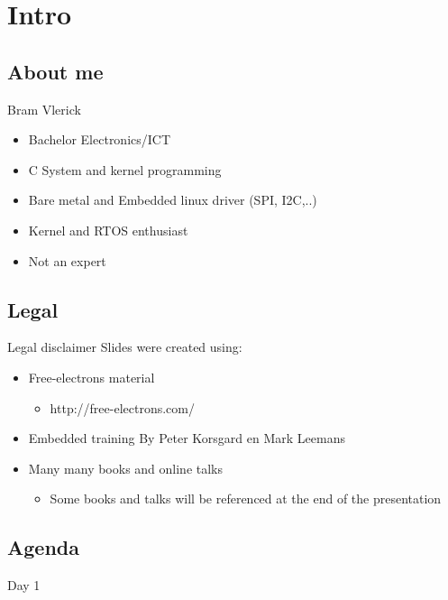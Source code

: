 \section{Intro}
\subsection{About me}
\begin{frame}{Bram Vlerick}
\begin{itemize}
\item Bachelor Electronics/ICT
\item C System and kernel programming
\item Bare metal and Embedded linux driver (SPI, I2C,..)
\item Kernel and RTOS enthusiast
\item Not an expert
\end{itemize}
\end{frame}

\subsection{Legal}
\begin{frame}{Legal disclaimer}
Slides were created using:
\begin{itemize}
\item Free-electrons material
\begin{itemize}
\item http://free-electrons.com/
\end{itemize}
\item Embedded training By Peter Korsgard en Mark Leemans
\item Many many books and online talks
\begin{itemize}
\item Some books and talks will be referenced at the end of the presentation
\end{itemize}
\end{itemize}
\end{frame}

\subsection{Agenda}
\begin{frame}{Day 1}
\end{frame}
